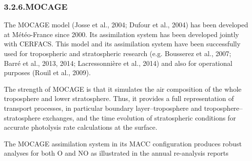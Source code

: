 \documentclass[9pt]{report}
\begin{document}
\subsubsection{3.2.6.\hspace*{0.5em}MOCAGE}\label{sec-mocage}%

\noindent{}The MOCAGE model (Josse et al., 2004; Dufour et al., 2004) has been developed at Météo-France since 2000. 
Its assimilation system has been developed jointly with CERFACS. 
This model and its assimilation system have been successfully used for tropospheric and stratospheric research (e.g. Bousserez et al., 2007; Barré et al., 2013, 2014; Lacressonnière et al., 2014) and also for operational purposes (Rouïl et al., 2009).%

The strength of MOCAGE is that it simulates the air composition of the whole troposphere and lower stratosphere. 
Thus, it provides a full representation of transport processes, in particular boundary layer–troposphere and troposphere–stratosphere exchanges, and the time evolution of stratospheric conditions for accurate photolysis rate calculations at the surface.%

The MOCAGE assimilation system in its MACC conﬁguration produces robust analyses for both O and NO as illustrated in the annual re-analysis reports %
\end{document}
